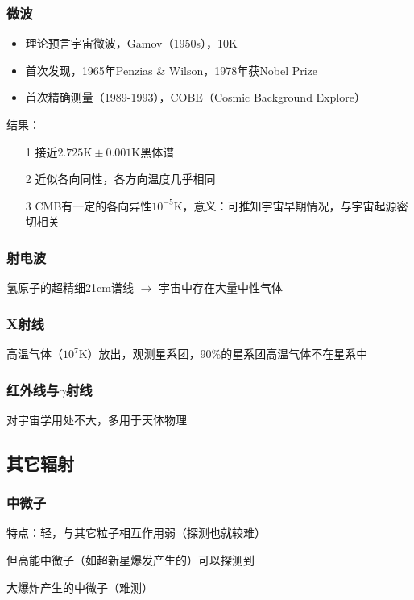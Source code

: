 \subsubsection{微波}
\begin{itemize}
	\item 理论预言宇宙微波，Gamov（1950s），10K
	\item 首次发现，1965年Penzias \& Wilson，1978年获Nobel Prize
	\item 首次精确测量（1989-1993），COBE（Cosmic Background Explore）
\end{itemize}
\par 结果：
\begin{itemize}
	\item[1] 接近$2.725 \mathrm{K} \pm 0.001 \mathrm{K}$黑体谱
	\item[2] 近似各向同性，各方向温度几乎相同
	\item[3] CMB有一定的各向异性$10^{-5} \mathrm{K}$，意义：可推知宇宙早期情况，与宇宙起源密切相关
\end{itemize}

\subsubsection{射电波}
\par 
氢原子的超精细21cm谱线 $\rightarrow$ 宇宙中存在大量中性气体

\subsubsection{X射线}
\par 
高温气体（$10^7 \mathrm{K}$）放出，观测星系团，90\%的星系团高温气体不在星系中

\subsubsection{红外线与$\gamma$射线}
\par 
对宇宙学用处不大，多用于天体物理

\subsection{其它辐射}
\subsubsection{中微子}
\par
特点：轻，与其它粒子相互作用弱（探测也就较难）
\par 
但高能中微子（如超新星爆发产生的）可以探测到
\par 
大爆炸产生的中微子（难测）

